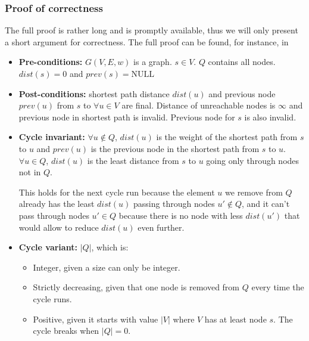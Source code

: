 \subsubsection{Proof of correctness}
The full proof is rather long and is promptly available, thus we will only present a short argument for correctness. The full proof can be found, for instance, in \cite[p.~659]{intro-alg}
\begin{itemize}
    \item \textbf{Pre-conditions:} $G(V, E, w)$ is a graph. $s \in V$. $Q$ contains all nodes. $dist(s)=0$ and $prev(s)=\text{NULL}$
    \item \textbf{Post-conditions:} shortest path distance $dist(u)$ and previous node $prev(u)$ from $s$ to $\forall u \in V$ are final. Distance of unreachable nodes is $\infty$ and previous node in shortest path is invalid. Previous node for $s$ is also invalid.\par
    \item \textbf{Cycle invariant:} $\forall u \not \in Q$, $dist(u)$ is the weight of the shortest path from $s$ to $u$ and $prev(u)$ is the previous node in the shortest path from $s$ to $u$. $\forall u \in Q$, $dist(u)$ is the least distance from $s$ to $u$ going only through nodes not in $Q$.\par
    This holds for the next cycle run because the element $u$ we remove from $Q$ already has the least $dist(u)$ passing through nodes $u' \not \in Q$, and it can't pass through nodes $u' \in Q$ because there is no node with less $dist(u')$ that would allow to reduce $dist(u)$ even further.
    \item \textbf{Cycle variant:} $|Q|$, which is:
    \begin{itemize}
        \item Integer, given a size can only be integer.
        \item Strictly decreasing, given that one node is removed from $Q$ every time the cycle runs.
        \item Positive, given it starts with value $|V|$ where $V$ has at least node $s$. The cycle breaks when $|Q| = 0$.
    \end{itemize}
\end{itemize}
